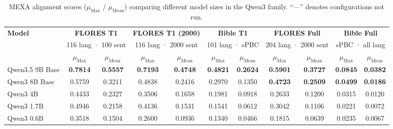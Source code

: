 \documentclass{article}
\begin{document}
\begin{table}[t]
\centering
\footnotesize

\caption{
MEXA alignment scores ($\mu_{\text{Max}}$ / $\mu_{\text{Mean}}$) comparing different model sizes in the Qwen3 family.
``---'' denotes configurations not run.
}

\label{tab:qwen_scaling}

\begin{adjustbox}{width=\textwidth}

\begin{tabular}{l|cc|cc|cc|cc|cc}

\toprule

\textbf{Model}
& \multicolumn{2}{c|}{\textbf{FLORES T1}}
& \multicolumn{2}{c|}{\textbf{FLORES T1 (2000)}}
& \multicolumn{2}{c|}{\textbf{Bible T1}}
& \multicolumn{2}{c|}{\textbf{FLORES Full}}
& \multicolumn{2}{c}{\textbf{Bible Full}} \\

& \multicolumn{2}{c|}{116 lang · 100 sent}
& \multicolumn{2}{c|}{116 lang · 2000 sent}
& \multicolumn{2}{c|}{101 lang · sPBC}
& \multicolumn{2}{c|}{204 lang · 2000 sent}
& \multicolumn{2}{c}{sPBC · all lang} \\

& $\mu_{\text{Max}}$
& $\mu_{\text{Mean}}$
& $\mu_{\text{Max}}$
& $\mu_{\text{Mean}}$
& $\mu_{\text{Max}}$
& $\mu_{\text{Mean}}$
& $\mu_{\text{Max}}$
& $\mu_{\text{Mean}}$
& $\mu_{\text{Max}}$
& $\mu_{\text{Mean}}$ \\

\midrule

Qwen3.5 9B Base
& \textbf{0.7814} & \textbf{0.5557}
& \textbf{0.7193} & \textbf{0.4748}
& \textbf{0.4821} & \textbf{0.2624}
& \textbf{0.5901} & \textbf{0.3727}
& \textbf{0.0845} & \textbf{0.0382} \\

Qwen3 8B Base
& 0.5759 & 0.3211
& 0.4838 & 0.2416
& 0.2970 & 0.1350
& \textbf{0.4723} & \textbf{0.2509}
& \textbf{0.0499} & \textbf{0.0186} \\

Qwen3 4B
& 0.4433 & 0.2327
& 0.3506 & 0.1658
& 0.1981 & 0.0918
& 0.2633 & 0.1200
& 0.0315 & 0.0120 \\

Qwen3 1.7B
& 0.4946 & 0.2158
& 0.4136 & 0.1531
& 0.1541 & 0.0612
& 0.3042 & 0.1106
& 0.0221 & 0.0072 \\

Qwen3 0.6B
& 0.3518 & 0.1504
& 0.2600 & 0.0936
& 0.1340 & 0.0466
& 0.1815 & 0.0639
& 0.0235 & 0.0067 \\

\bottomrule

\end{tabular}

\end{adjustbox}

\end{table}
\end{document}
